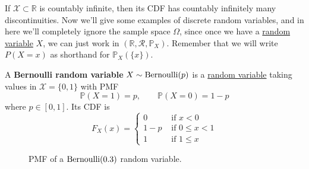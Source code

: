   If $\mathcal{X} \subset \mathbb{R}$ is countably infinite, then its CDF has countably infinitely many discontinuities. Now we'll give some examples of discrete random variables, and in here we'll completely ignore the sample space $\Omega$, since once we have a \hyperref[def:random-variable]{random variable} $X$, we can just work in $(\mathbb{R}, \mathcal{R}, \mathbb{P}_X)$. Remember that we will write $P(X = x)$ as shorthand for $\mathbb{P}_X (\{x\})$. 


  \begin{definition}
    \label{def:indicator-bernoulli-random-variable}
    A \textbf{Bernoulli random variable} $X \sim \operatorname{Bernoulli}(p)$ is a \hyperref[def:discrete-random-variable]{random variable} taking values in $\mathcal{X} = \{0, 1\}$ with PMF 
    \begin{equation}
      \mathbb{P}(X = 1) = p, \qquad \mathbb{P}(X = 0) = 1 - p
    \end{equation}
    where $p \in [0, 1]$. 
    Its CDF is 
    \begin{equation}
      F_X (x) = \begin{cases} 0 & \text{ if } x < 0 \\ 1 - p & \text{ if } 0 \leq x < 1 \\ 1 & \text{ if } 1 \leq x \end{cases}
    \end{equation}
  \begin{center}
    \captionsetup{type=figure}
    \begin{subfigure}[b]{0.48\textwidth}
      \centering
      \caption{PMF of a $\operatorname{Bernoulli}(0.3)$ random variable.}
      \label{fig:bernoulli-pmf}
    \end{subfigure}

\end{center}
\end{definition}
